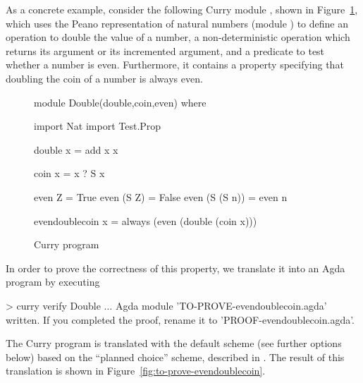 As a concrete example, consider the following Curry module ,
shown in Figure~\ref{fig:double-curry},
which uses the Peano representation of natural numbers
(module ) to define an operation to double the value
of a number, a non-deterministic operation 
which returns its argument or its incremented argument,
and a predicate to test whether a number is even.
Furthermore, it contains a property specifying that
doubling the coin of a number is always even.

\begin{figure}[t]
\begin{curry}

module Double(double,coin,even) where

import Nat
import Test.Prop

double x = add x x

coin x = x ? S x

even Z         = True
even (S Z)     = False
even (S (S n)) = even n

evendoublecoin x = always (even (double (coin x)))

\end{curry}
\caption{Curry program \label{fig:double-curry}}
\end{figure}

In order to prove the correctness of this property,
we translate it into an Agda program by executing
%
\begin{curry}
> curry verify Double
$\ldots$
Agda module 'TO-PROVE-evendoublecoin.agda' written.
If you completed the proof, rename it to 'PROOF-evendoublecoin.agda'.
\end{curry}
%
The Curry program is translated with
the default scheme (see further options below) based on
the ``planned choice'' scheme, described in \cite{AntoyHanusLibby16}.
The result of this translation is shown in
Figure~\ref{fig:to-prove-evendoublecoin}.

